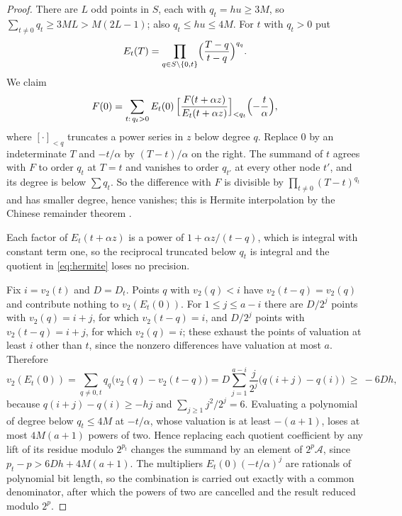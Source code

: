 \documentclass[11pt,reqno]{amsart}
\numberwithin{equation}{section}
\theoremstyle{plain}
\theoremstyle{definition}
\theoremstyle{remark}
\newcommand{\cA}{\mathcal{A}}
\newcommand{\vtwo}{v_2}
\begin{document}
\begin{proof}
There are $L$ odd points in $S$, each with $q_t=hu\ge3M$, so
$\sum_{t\ne0}q_t\ge3ML>M(2L-1)$; also $q_t\le hu\le4M$. For $t$ with $q_t>0$ put
\[
E_t(T)=\prod_{q\in S\setminus\{0,t\}}\Bigl(\frac{T-q}{t-q}\Bigr)^{q_q}.
\]
We claim
\begin{equation}\label{eq:hermite}
F(0)=\sum_{t:\,q_t>0}E_t(0)\,\Bigl[\frac{F(t+\alpha z)}{E_t(t+\alpha z)}\Bigr]_{<q_t}\Bigl(-\frac t\alpha\Bigr),
\end{equation}
where $[\cdot]_{<q}$ truncates a power series in $z$ below degree $q$. Replace $0$
by an indeterminate $T$ and $-t/\alpha$ by $(T-t)/\alpha$ on the right. The
summand of $t$ agrees with $F$ to order $q_t$ at $T=t$ and vanishes to order
$q_{t'}$ at every other node $t'$, and its degree is below $\sum q_t$. So the
difference with $F$ is divisible by $\prod_{t\ne0}(T-t)^{q_t}$ and has smaller
degree, hence vanishes; this is Hermite interpolation by the Chinese remainder
theorem \cite[Section 5.6]{vzGG13}.

Each factor of $E_t(t+\alpha z)$ is a power of $1+\alpha z/(t-q)$, which is
integral with constant term one, so the reciprocal truncated below $q_t$ is
integral and the quotient in \eqref{eq:hermite} loses no precision.

Fix $i=\vtwo(t)$ and $D=D_t$. Points $q$ with $\vtwo(q)<i$ have
$\vtwo(t-q)=\vtwo(q)$ and contribute nothing to $\vtwo(E_t(0))$. For $1\le j\le
a-i$ there are $D/2^j$ points with $\vtwo(q)=i+j$, for which $\vtwo(t-q)=i$, and
$D/2^j$ points with $\vtwo(t-q)=i+j$, for which $\vtwo(q)=i$; these exhaust the
points of valuation at least $i$ other than $t$, since the nonzero differences
have valuation at most $a$. Therefore
\begin{equation}\label{eq:vEt}
\vtwo(E_t(0))=\sum_{q\ne0,t}q_q\bigl(\vtwo(q)-\vtwo(t-q)\bigr)
=D\sum_{j=1}^{a-i}\frac j{2^j}\bigl(q(i+j)-q(i)\bigr)\ \ge\ -6Dh,
\end{equation}
because $q(i+j)-q(i)\ge-hj$ and $\sum_{j\ge1}j^2/2^j=6$. Evaluating a polynomial of
degree below $q_t\le4M$ at $-t/\alpha$, whose valuation is at least $-(a+1)$,
loses at most $4M(a+1)$ powers of two. Hence replacing each quotient coefficient
by any lift of its residue modulo $2^{p_t}$ changes the summand by an element of
$2^p\cA$, since $p_t-p>6Dh+4M(a+1)$. The multipliers $E_t(0)(-t/\alpha)^j$ are
rationals of polynomial bit length, so the combination is carried out exactly
with a common denominator, after which the powers of two are cancelled and the
result reduced modulo $2^p$.
\end{proof}
\end{document}
